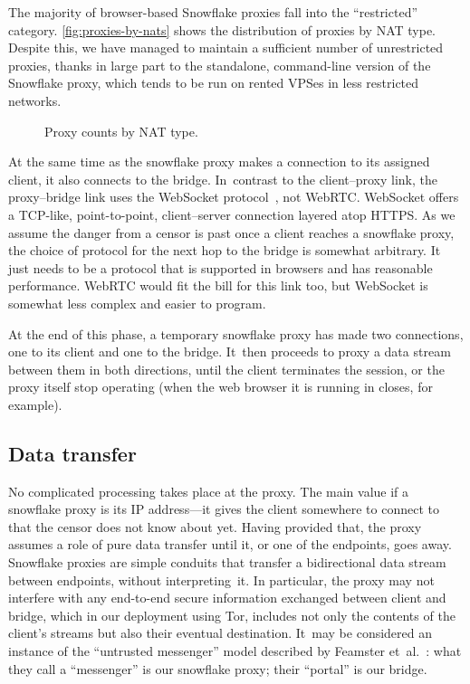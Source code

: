 \documentclass[letterpaper,twocolumn]{article}
\begin{document}
The majority of browser-based Snowflake proxies
fall into the ``restricted'' category.
\autoref{fig:proxies-by-nats} shows the distribution of proxies by NAT type.
Despite this, we have managed to maintain a sufficient number of unrestricted proxies,
thanks in large part to the standalone, command-line
version of the Snowflake proxy,
which tends to be run on rented VPSes in less restricted networks.

\begin{figure}
\caption{Proxy counts by NAT type.}
\label{fig:proxies-by-nats}
\end{figure}

At the same time as the snowflake proxy makes a connection to its assigned client,
it also connects to the bridge.
In~contrast to the client--proxy link,
the proxy--bridge link
uses the WebSocket protocol~\cite{rfc6455}, not WebRTC.
WebSocket offers a TCP-like, point-to-point, client--server connection
layered atop HTTPS.
As we assume the danger from a censor is past
once a client reaches a snowflake proxy,
the choice of protocol for the next hop to the bridge is somewhat arbitrary.
It just needs to be a protocol that is supported in browsers
and has reasonable performance.
WebRTC would fit the bill for this link too,
but WebSocket is somewhat less complex and easier to program.

At the end of this phase,
a temporary snowflake proxy has made two connections,
one to its client and one to the bridge.
It~then proceeds to proxy a data stream between them
in both directions,
until the client terminates the session,
or the proxy itself stop operating
(when the web browser it is running in closes, for example).

\subsection{Data transfer}
\label{sec:data-transfer}

No complicated processing takes place at the proxy.
The main value if a snowflake proxy is its IP address---it
gives the client somewhere to connect to that the censor does not know about yet.
Having provided that, the proxy assumes a role
of pure data transfer until it, or one of the endpoints, goes away.
Snowflake proxies are simple conduits that transfer
a bidirectional data stream between endpoints,
without interpreting~it.
In particular, the proxy may not interfere with any
end-to-end secure information exchanged between client and bridge,
which in our deployment using Tor,
includes not only the contents of the client's streams
but also their eventual destination.
It~may be considered an instance of the
``untrusted messenger'' model described by
Feamster et~al.~\cite[\S 3]{Feamster2003a}:
what they call a ``messenger'' is our snowflake proxy;
their ``portal'' is our bridge.
\end{document}
